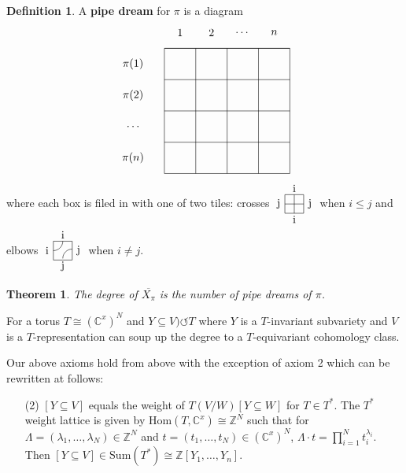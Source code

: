 \documentclass[12pt]{amsart}
\numberwithin{equation}{section}
\newtheorem{Theorem}[equation]{Theorem}
\theoremstyle{definition}
\newtheorem{Definition}[equation]{Definition}
\numberwithin{figure}{section}
\newcommand{\C}{\mathbb{C}}
\newcommand{\Z}{\mathbb{Z}}
\begin{document}
\begin{Definition}
A \textbf{pipe dream} for $\pi$ is a diagram $$\vcenter{\hbox{\begin{tikzpicture}
\draw[-] (1,4) to (5,4);
\draw[-] (5,4) to (5,0);
\draw[-] (5,0) to (1,0);
\draw[-] (1,0) to (1,4);
\node (1) at (1.5,4.5) {$1$};
\node (2) at (2.5,4.5) {$2$};
\node (...) at (3.5,4.5) {$\cdots$};
\node (n) at (4.5,4.5) {$n$};
\node (p1) at (0,3.5) {$\pi(1)$};
\node (p2) at (0,2.5) {$\pi(2)$};
\node (p) at (0,1.5) {$\hdots$};
\node (pn) at (0,.5) {$\pi(n)$};
\draw[-] (2,4) to (2,0);
\draw[-] (3,4) to (3,0);
\draw[-] (4,4) to (4,0);
\draw[-] (1,1) to (5,1);
\draw[-] (1,2) to (5,2);
\draw[-] (1,3) to (5,3);
\draw[-] (1,4) to (5,4);
\end{tikzpicture}}}$$
where each box is filed in with one of two tiles: crosses $\vcenter{\hbox{\begin{tikzpicture}
\node at (0,.5) {j};
\node at (.5,1) {i};
\node at (1,.5) {j};
\node at (.5,0) {i};
\draw[-] (.2,.2) to (.2,.8);
\draw[-] (.2,.8) to (.8,.8);
\draw[-] (.8,.8) to (.8,.2);
\draw[-] (.8,.2) to (.2,.2);
\draw[-] (.2,.5) to (.8,.5);
\draw[-] (.5,.2) to (.5,.8);
\end{tikzpicture}}}$ when $i\leq j$ and elbows $\vcenter{\hbox{\begin{tikzpicture}
\node at (0,.5) {i};
\node at (.5,1) {i};
\node at (1,.5) {j};
\node at (.5,0) {j};
\draw[-] (.2,.2) to (.2,.8);
\draw[-] (.2,.8) to (.8,.8);
\draw[-] (.8,.8) to (.8,.2);
\draw[-] (.8,.2) to (.2,.2);
\draw (.2,.5) arc[start angle=-90, end angle=0, radius=.3];
\draw (.5,.25) arc[start angle=180, end angle=90, radius=.3];
\end{tikzpicture}}}$ when $i\neq j$.
\end{Definition}

\begin{Theorem}
The degree of $\overline{X_\pi}$ is the number of pipe dreams of $\pi$.
\end{Theorem}
For a torus $T\cong (\C^x)^N$ and $Y\subseteq V)\circlearrowleft T$ where $Y$ is a $T$-invariant subvariety and $V$ is a $T$-representation can soup up the degree to a $T$-equivariant cohomology class. 

Our above axioms hold from above with the exception of axiom 2 which can be rewritten at follows: \begin{enumerate}
\item[(2)] $[Y\subseteq V]$ equals the weight of $T(V/W)[Y\subseteq W]$ for $T\in T^*$. The $T^*$ weight lattice is given by Hom$(T,\C^x)\cong\Z^N$ such that for $\Lambda=(\lambda_1,\ldots,\lambda_N)\in\Z^N$ and $t=(t_1,\ldots,t_N)\in(\C^x)^N$, $\Lambda\cdot t=\prod\limits_{i=1}^N t_i^{\lambda_i}$. Then $[Y\subseteq V]\in\text{Sum}(T^*)\cong\Z[Y_1,\ldots,Y_n]$.
\end{enumerate}
\end{document}
